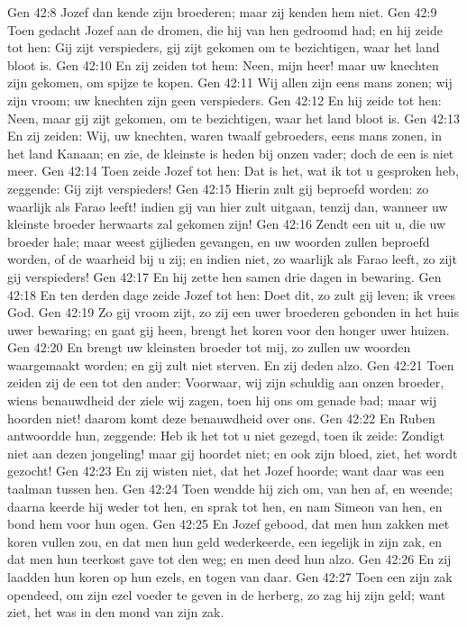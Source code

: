 Gen 42:8  Jozef dan kende zijn broederen; maar zij kenden hem niet.
Gen 42:9  Toen gedacht Jozef aan de dromen, die hij van hen gedroomd had; en hij zeide tot hen: Gij zijt verspieders, gij zijt gekomen om te bezichtigen, waar het land bloot is.
Gen 42:10  En zij zeiden tot hem: Neen, mijn heer! maar uw knechten zijn gekomen, om spijze te kopen.
Gen 42:11  Wij allen zijn eens mans zonen; wij zijn vroom; uw knechten zijn geen verspieders.
Gen 42:12  En hij zeide tot hen: Neen, maar gij zijt gekomen, om te bezichtigen, waar het land bloot is.
Gen 42:13  En zij zeiden: Wij, uw knechten, waren twaalf gebroeders, eens mans zonen, in het land Kanaan; en zie, de kleinste is heden bij onzen vader; doch de een is niet meer.
Gen 42:14  Toen zeide Jozef tot hen: Dat is het, wat ik tot u gesproken heb, zeggende: Gij zijt verspieders!
Gen 42:15  Hierin zult gij beproefd worden: zo waarlijk als Farao leeft! indien gij van hier zult uitgaan, tenzij dan, wanneer uw kleinste broeder herwaarts zal gekomen zijn!
Gen 42:16  Zendt een uit u, die uw broeder hale; maar weest gijlieden gevangen, en uw woorden zullen beproefd worden, of de waarheid bij u zij; en indien niet, zo waarlijk als Farao leeft, zo zijt gij verspieders!
Gen 42:17  En hij zette hen samen drie dagen in bewaring.
Gen 42:18  En ten derden dage zeide Jozef tot hen: Doet dit, zo zult gij leven; ik vrees God.
Gen 42:19  Zo gij vroom zijt, zo zij een uwer broederen gebonden in het huis uwer bewaring; en gaat gij heen, brengt het koren voor den honger uwer huizen.
Gen 42:20  En brengt uw kleinsten broeder tot mij, zo zullen uw woorden waargemaakt worden; en gij zult niet sterven. En zij deden alzo.
Gen 42:21  Toen zeiden zij de een tot den ander: Voorwaar, wij zijn schuldig aan onzen broeder, wiens benauwdheid der ziele wij zagen, toen hij ons om genade bad; maar wij hoorden niet! daarom komt deze benauwdheid over ons.
Gen 42:22  En Ruben antwoordde hun, zeggende: Heb ik het tot u niet gezegd, toen ik zeide: Zondigt niet aan dezen jongeling! maar gij hoordet niet; en ook zijn bloed, ziet, het wordt gezocht!
Gen 42:23  En zij wisten niet, dat het Jozef hoorde; want daar was een taalman tussen hen.
Gen 42:24  Toen wendde hij zich om, van hen af, en weende; daarna keerde hij weder tot hen, en sprak tot hen, en nam Simeon van hen, en bond hem voor hun ogen.
Gen 42:25  En Jozef gebood, dat men hun zakken met koren vullen zou, en dat men hun geld wederkeerde, een iegelijk in zijn zak, en dat men hun teerkost gave tot den weg; en men deed hun alzo.
Gen 42:26  En zij laadden hun koren op hun ezels, en togen van daar.
Gen 42:27  Toen een zijn zak opendeed, om zijn ezel voeder te geven in de herberg, zo zag hij zijn geld; want ziet, het was in den mond van zijn zak.

